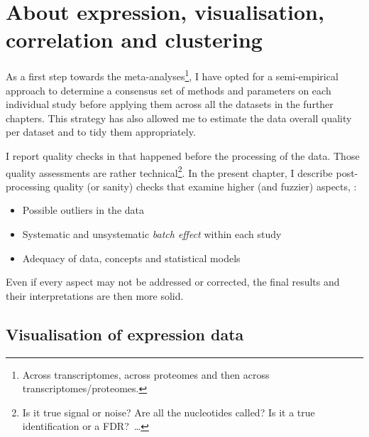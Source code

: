 \chapter{About expression, visualisation, correlation and clustering}
\label{ch:expression}

\begin{comment}
\setlength{\epigraphwidth}{\textwidth}%
\setlength{\epigraphrule}{0pt}%
\epigraphhead[70]{%
\epigraph{[..] 80\% of the data analysis task is spent on cleaning and
understanding the data.}{\cite{Dasu2003-bg}}%
}
\end{comment}

As a first step towards the meta-analyses\footnote{Across transcriptomes,
across proteomes and then across transcriptomes/proteomes.},
I have opted for a semi-empirical approach to determine
a consensus set of methods and parameters on each individual study
before applying them across all the datasets in the further chapters.
This strategy has also allowed me
to estimate the data overall quality per dataset and to tidy them appropriately.

I report quality checks in 
that happened before the processing of the data.
Those quality assessments are rather technical\footnote{Is it true signal
or noise?
Are all the nucleotides called?
Is it a true identification or a \gls{FDR}?~\ldots}.
In the present chapter, I describe post-processing quality (or sanity) checks
that examine higher (and fuzzier) aspects, \eg:
\begin{itemize}[topsep=0pt,nosep]
    \item Possible outliers in the data
    \item Systematic and unsystematic \emph{batch effect} within each study
    \item Adequacy of data, concepts and statistical models
\end{itemize}
Even if every aspect may not be addressed or corrected,
the final results and their interpretations are then more solid.

\section{Visualisation of expression data}

